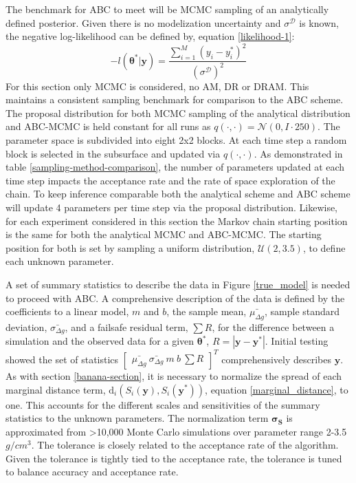 The benchmark for ABC to meet will be MCMC sampling of an analytically defined posterior. Given there is no modelization uncertainty and $\sigma^{\mathcal{D}}$ is known, the negative log-likelihood can be defined by, equation \ref{likelihood-1}:
\begin{equation}
	-l(\bm{\theta^*}|\bm{y}) = \frac{\sum_{i = 1}^{M}(y_i-y^*_i)^2}{(\sigma^{\mathcal{D}})^2}
	\label{analytical-applied-likelihood}
\end{equation}
For this section only MCMC is considered, no AM, DR or DRAM. This maintains a consistent sampling benchmark for comparison to the ABC scheme. The proposal distribution for both MCMC sampling of the analytical distribution and ABC-MCMC is held constant for all runs as $q(\cdot,\cdot) = \mathcal{N}(0,I\cdot250)$. The parameter space is subdivided into eight 2x2 blocks. At each time step a random block is selected in the subsurface and updated via $q(\cdot,\cdot)$. As demonstrated in table \ref{sampling-method-comparison}, the number of parameters updated at each time step impacts the acceptance rate and the rate of space exploration of the chain. To keep inference comparable both the analytical scheme and ABC scheme will update 4 parameters per time step via the proposal distribution. Likewise, for each experiment considered in this section the Markov chain starting position is the same for both the analytical MCMC and ABC-MCMC. The starting position for both is set by sampling a uniform distribution, $\mathcal{U}(2,3.5)$, to define each unknown parameter. \par

A set of summary statistics to describe the data in Figure \ref{true_model} is needed to proceed with ABC. A comprehensive description of the data is defined by the coefficients to a linear model, $m$ and $b$, the sample mean, $\bar{\mu_{\Delta g}}$, sample standard deviation, $\bar{\sigma_{\Delta g}}$, and a failsafe residual term, $\sum R$, for the difference between a simulation and the observed data for a given $\bm{\theta^*}$, $R = |\bm{y}-\bm{y^*}|$. Initial testing showed the set of statistics $\begin{bmatrix}
\bar{\mu_{\Delta g}}\ \bar{\sigma_{\Delta g}}\ m\ b\ \sum R
\end{bmatrix}^T$ comprehensively describes $\bm{y}$. As with section \ref{banana-section}, it is necessary to normalize the spread of each marginal distance term, $\text{d}_i(S_i(\bm{y}),S_i(\bm{y^*}))$, equation \ref{marginal_distance}, to one. This accounts for the different scales and sensitivities of the summary statistics to the unknown parameters. The normalization term $\bm{\sigma_S}$ is approximated from >10,000 Monte Carlo simulations over parameter range 2-3.5 $g/cm^3$. The tolerance is closely related to the acceptance rate of the algorithm. Given the tolerance is tightly tied to the acceptance rate, the tolerance is tuned to balance accuracy and acceptance rate.\par

